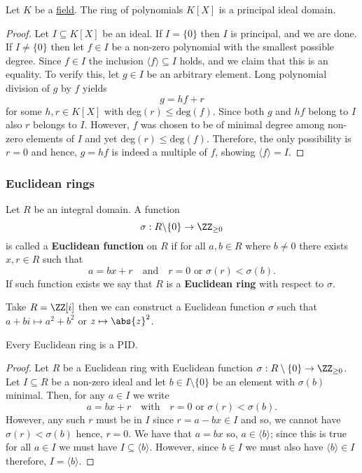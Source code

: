 \documentclass[12pt, a4paper]{article}
\begin{document}
\begin{mdthm}
    Let \(K\) be a \underline{field}. The ring of polynomials \(K[X]\) is a principal ideal domain.
\end{mdthm}

\begin{proof}
    Let \(I \subseteq K[X]\) be an ideal. If \(I = \{0\}\) then \(I\) is principal, and we are done. If \(I \neq \{0\}\) then let \(f \in I\) be a non-zero polynomial with the smallest possible degree. Since \(f \in I\) the inclusion \(\langle f \rangle \subseteq I\) holds, and we claim that this is an equality. To verify this, let \(g \in I\) be an arbitrary element. Long polynomial division of \(g\) by \(f\) yields 
    \[g=hf+r\]
    for some \(h,r \in K[X]\) with deg\((r) \leq \text{deg}(f)\). Since both \(g\) and \(hf\) belong to \(I\) also \(r\) belongs to \(I\). However, \(f\) was chosen to be of minimal degree among non-zero elements of \(I\) and yet deg\((r) \leq \text{deg}(f)\). Therefore, the only possibility is \(r=0\) and hence, \(g=hf\) is indeed a multiple of \(f\), showing \(\langle f \rangle =I\).
\end{proof}

\subsubsection{Euclidean rings}

\begin{definition}
    Let \(R\) be an integral domain. A function 
    \[\sigma : R \backslash \{0\} \to \ZZ_{\geq 0}\]
    is called a \textbf{Euclidean function} on \(R\) if for all \(a,b \in R\) where \(b \neq 0\) there exists \(x,r \in R\) such that 
    \[a = bx+r \quad \text{and} \quad r=0 \text{ or } \sigma(r) < \sigma(b).\]
    If such function exists we say that \(R\) is a \textbf{Euclidean ring} with respect to \(\sigma\).
\end{definition}

\begin{example}
    Take \(R=\ZZ[i]\) then we can construct a Euclidean function \(\sigma\) such that \(a+bi \mapsto a^2+b^2\) or \(z \mapsto \abs{z}^2\).
\end{example}

\begin{mdthm}
    Every Euclidean ring is a PID.
\end{mdthm}

\begin{proof}
    Let \(R\) be a Euclidean ring with Euclidean function \(\sigma:R\setminus \{0\} \to \ZZ_{\geq 0}\). Let \(I \subseteq R\) be a non-zero ideal and let \(b \in I \setminus\{0\}\) be an element with \(\sigma(b)\) minimal. Then, for any \(a \in I\) we write 
    \[a=bx+r \quad \text{with} \quad r=0 \text{ or } \sigma(r) <\sigma(b).\]
    However, any such \(r\) must be in \(I\) since \(r = a-bx \in I\) and so, we cannot have \(\sigma(r)<\sigma(b)\) hence, \(r=0\). We have that \(a=bx\) so, \(a \in \langle b \rangle\); since this is true for all \(a \in I \) we must have \(I \subseteq \langle b \rangle\). However, since \(b \in I\) we must also have \(\langle b\rangle \in I\) therefore, \(I=\langle b \rangle\).
\end{proof}
\end{document}
